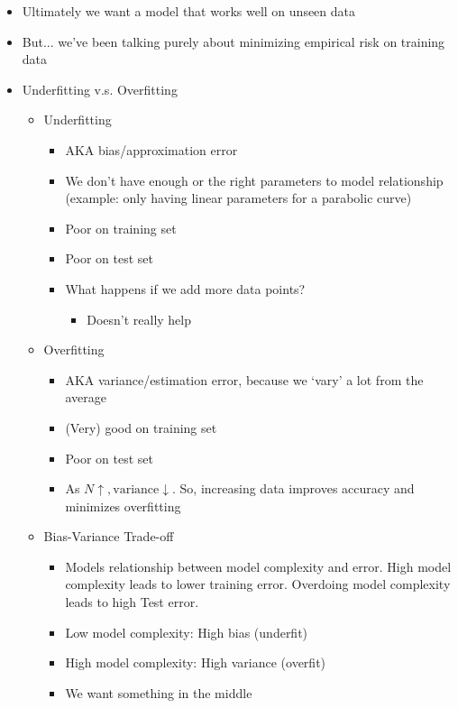 \documentclass[10pt, oneside]{article}
\begin{document}
\begin{itemize}
    \item Ultimately we want a model that works well on unseen data
    \item But... we've been talking purely about minimizing empirical risk on training data
    \item Underfitting v.s. Overfitting
    \begin{itemize}
        \item Underfitting
        \begin{itemize}
            \item AKA bias/approximation error
            \item We don't have enough or the right parameters to model relationship (example: only having linear parameters for a parabolic curve)
            \item Poor on training set
            \item Poor on test set
            \item What happens if we add more data points?
            \begin{itemize}
                \item Doesn't really help
            \end{itemize}
        \end{itemize}
        \item Overfitting
        \begin{itemize}
            \item AKA variance/estimation error, because we `vary' a lot from the average
            \item (Very) good on training set
            \item Poor on test set
            \item As $N \uparrow, \text{variance} \downarrow$. So, increasing data improves accuracy and minimizes overfitting
        \end{itemize}
        \item Bias-Variance Trade-off
        \begin{itemize}
            \item Models relationship between model complexity and error. High model complexity leads to lower training error. Overdoing model complexity leads to high Test error.
            \item Low model complexity: High bias (underfit)
            \item High model complexity: High variance (overfit)
            \item We want something in the middle
        \end{itemize}
    \end{itemize}
\end{itemize}
\end{document}

